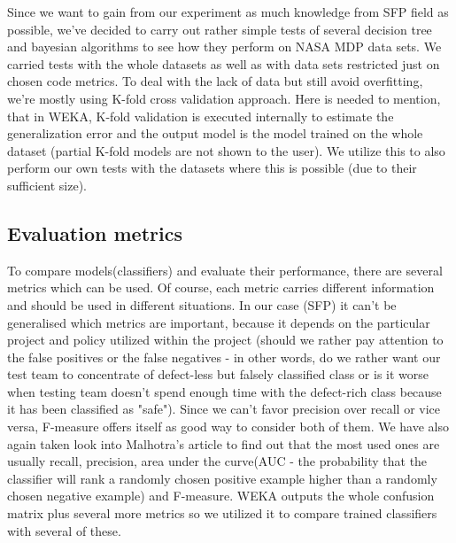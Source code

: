Since we want to gain from our experiment as much knowledge from SFP field as possible, we've decided to carry out rather simple tests of several decision tree and bayesian algorithms to see how they perform on NASA MDP data sets. We carried tests with the whole datasets as well as with data sets restricted just on chosen code metrics. To deal with the lack of data but still avoid overfitting, we're mostly using K-fold cross validation approach. Here is needed to mention, that in WEKA, K-fold validation is executed internally to estimate the generalization error and the output model is the model trained on the whole dataset (partial K-fold models are not shown to the user). We utilize this to also perform our own tests with the datasets where this is possible (due to their sufficient size).

\subsection{Evaluation metrics}
To compare models(classifiers) and evaluate their performance, there are several metrics which can be used. Of course, each metric carries different information and should be used in different situations. In our case (SFP) it can't be generalised which metrics are important, because it depends on the particular project and policy utilized within the project (should we rather pay attention to the false positives or the false negatives - in other words, do we rather want our test team to concentrate of defect-less but falsely classified class or is it worse when testing team doesn't spend enough time with the defect-rich class because it has been classified as "safe"). Since we can't favor precision over recall or vice versa, F-measure offers itself as good way to consider both of them. We have also again taken look into Malhotra's article\cite{malhotra2015systematic} to find out that the most used ones are usually recall, precision, area under the curve(AUC - the probability that the classifier will rank a randomly chosen positive example higher than a randomly chosen negative example\cite{japkowicz2011evaluating}) and F-measure. WEKA outputs the whole confusion matrix plus several more metrics so we utilized it to compare trained classifiers with several of these. 